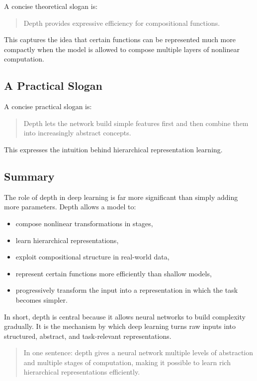 A concise theoretical slogan is:

\begin{quote}
Depth provides expressive efficiency for compositional functions.
\end{quote}

This captures the idea that certain functions can be represented much more compactly when the model is allowed to compose multiple layers of nonlinear computation.

\subsection{A Practical Slogan}

A concise practical slogan is:

\begin{quote}
Depth lets the network build simple features first and then combine them into increasingly abstract concepts.
\end{quote}

This expresses the intuition behind hierarchical representation learning.

\subsection{Summary}

The role of depth in deep learning is far more significant than simply adding more parameters. Depth allows a model to:
\begin{itemize}
    \item compose nonlinear transformations in stages,
    \item learn hierarchical representations,
    \item exploit compositional structure in real-world data,
    \item represent certain functions more efficiently than shallow models,
    \item progressively transform the input into a representation in which the task becomes simpler.
\end{itemize}

In short, depth is central because it allows neural networks to build complexity gradually. It is the mechanism by which deep learning turns raw inputs into structured, abstract, and task-relevant representations.

\begin{quote}
In one sentence: depth gives a neural network multiple levels of abstraction and multiple stages of computation, making it possible to learn rich hierarchical representations efficiently.
\end{quote}